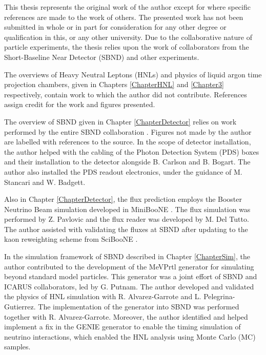 
\begin{declaration}

This thesis represents the original work of the author except for where specific references are made to the work of others.
The presented work has not been submitted in whole or in part for consideration for any other degree or qualification in this, or any other university. 
Due to the collaborative nature of particle experiments, the thesis relies upon the work of collaborators from the Short-Baseline Near Detector (SBND) and other experiments.

The overviews of Heavy Neutral Leptons (HNLs) and physics of liquid argon time projection chambers, given in Chapters \ref{ChapterHNL} and \ref{Chapter3} respectively, contain work to which the author did not contribute.
References assign credit for the work and figures presented.

The overview of SBND given in Chapter \ref{ChapterDetector} relies on work performed by the entire SBND collaboration \cite{SBNProgram,sbnd_det}.
Figures not made by the author are labelled with references to the source.
In the scope of detector installation, the author helped with the cabling of the Photon Detection System (PDS) boxes and their installation to the detector alongside B. Carlson and B. Bogart.
The author also installed the PDS readout electronics, under the guidance of M. Stancari and W. Badgett.

Also in Chapter \ref{ChapterDetector}, the flux prediction employs the Booster Neutrino Beam simulation developed in MiniBooNE \cite{BNBFlux}.
The flux simulation was performed by Z. Pavlovic and the flux reader was developed by M. Del Tutto. 
The author assisted with validating the fluxes at SBND after updating to the kaon reweighting scheme from SciBooNE \cite{SciBooNE} .

In the simulation framework of SBND described in Chapter \ref{ChapterSim}, the author contributed to the development of the MeVPrtl generator for simulating beyond standard model particles.
This generator was a joint effort of SBND and ICARUS collaborators, led by G. Putnam.
The author developed and validated the physics of HNL simulation with R. Alvarez-Garrote and L. Pelegrina-Gutierrez.
The implementation of the generator into SBND was performed together with R. Alvarez-Garrote.
Moreover, the author identified and helped implement a fix in the GENIE generator to enable the timing simulation of neutrino interactions, which enabled the HNL analysis using Monte Carlo (MC) samples.


\end{declaration}
